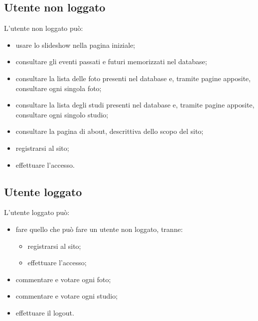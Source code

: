  \subsection{Utente non loggato}
 L'utente non loggato può:
 \begin{itemize}
 	\item usare lo slideshow nella pagina iniziale;
 	\item consultare gli eventi passati e futuri memorizzati nel database;
 	\item consultare la lista delle foto presenti nel database e, tramite pagine apposite, consultare ogni singola foto;
 	\item consultare la lista degli studi presenti nel database e, tramite pagine apposite, consultare ogni singolo studio;
 	\item consultare la pagina di about, descrittiva dello scopo del sito;
 	\item registrarsi al sito;
 	\item effettuare l'accesso.
 \end{itemize}
 \subsection{Utente loggato}
 L'utente loggato può:
 \begin{itemize}
 	\item fare quello che può fare un utente non loggato, tranne:
 	\begin{itemize}
 		\item registrarsi al sito;
 		\item effettuare l'accesso;
 	\end{itemize}
 	\item commentare e votare ogni foto;
 	\item commentare e votare ogni studio;
 	\item effettuare il logout.
 \end{itemize}
 
